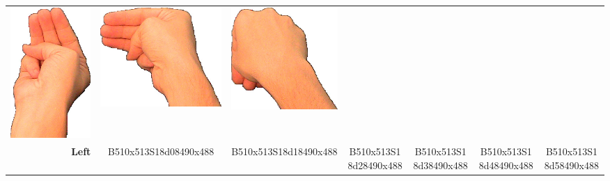 \documentclass{article}
\begin{document}
\begin{center}
\begin{tabular}{r*{6}{c}}
\includegraphics[scale=0.1]{images/06-05-4.jpg}&
\includegraphics[scale=0.1]{images/06-05-5.jpg}&
\includegraphics[scale=0.1]{images/06-05-6.jpg}\\
\textbf{Left}&
B510x513S18d08490x488&
B510x513S18d18490x488&
B510x513S18d28490x488&
B510x513S18d38490x488&
B510x513S18d48490x488&
B510x513S18d58490x488\\
\end{tabular}
\end{center}
\end{document}
